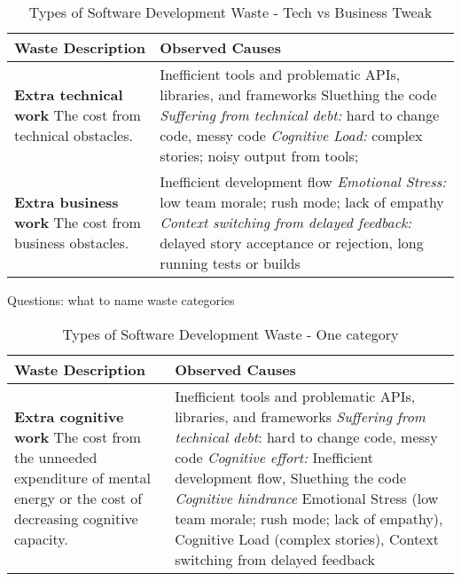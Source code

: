 \begin{table*}[htbp]
\renewcommand{\arraystretch}{1.3}
\centering
\caption{Types of Software Development Waste - Tech vs Business Tweak}
\label{Waste}
\begin{tabular}{|p{2.5in}|p{3.6in}|} %
\hline
\textbf{Waste} \newline Description  & Observed Causes 
\\ \hline
\textbf{Extra technical work} \newline   
The cost from technical obstacles.  & 
Inefficient tools and problematic APIs, libraries, and frameworks  \newline
Sluething the code \newline
\textit{Suffering from technical debt:} hard to change code, messy code \newline
\textit{Cognitive Load:} complex stories; noisy output from tools; \newline
\\ \hline
\textbf{Extra business work} \newline 
The cost from business obstacles. & 
Inefficient development flow \newline
\textit{Emotional Stress:} low team morale; rush mode; lack of empathy \newline 
\textit{Context switching from delayed feedback:} delayed story acceptance or rejection, long running tests or builds     \\ \hline
\end{tabular} 
\end{table*}

Questions: what to name waste categories


\begin{table*}[htbp]
\renewcommand{\arraystretch}{1.3}
\centering
\caption{Types of Software Development Waste - One category}
\label{Waste}
\begin{tabular}{|p{2.5in}|p{3.6in}|} %
\hline
\textbf{Waste} \newline Description  & Observed Causes 
\\ \hline
\textbf{Extra cognitive work} \newline   
The cost from the unneeded expenditure of mental energy or the cost of decreasing cognitive capacity. & 
Inefficient tools and problematic APIs, libraries, and frameworks  \newline
\textit{Suffering from technical debt}: hard to change code, messy code \newline
\textit{Cognitive effort:} Inefficient development flow, Sluething the code \newline
\textit{Cognitive hindrance} Emotional Stress (low team morale; rush mode; lack of empathy), Cognitive Load (complex stories), Context switching from delayed feedback
\\ \hline
\end{tabular} 
\end{table*}


